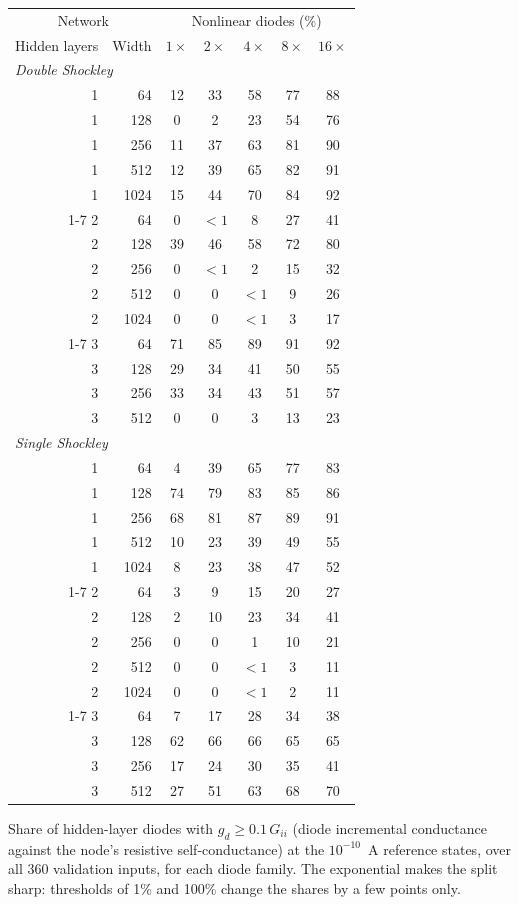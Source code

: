 \documentclass[11pt,a4paper]{article}
\begin{document}
\begin{center}
\small
\begin{tabular}{rr|ccccc}
\multicolumn{2}{c|}{Network} & \multicolumn{5}{c}{Nonlinear diodes (\%)} \\
Hidden layers & Width & $1\times$ & $2\times$ & $4\times$ & $8\times$ & $16\times$ \\
\hline
\multicolumn{7}{l}{\emph{Double Shockley}} \\
1 & 64 & 12 & 33 & 58 & 77 & 88 \\
1 & 128 & 0 & 2 & 23 & 54 & 76 \\
1 & 256 & 11 & 37 & 63 & 81 & 90 \\
1 & 512 & 12 & 39 & 65 & 82 & 91 \\
1 & 1024 & 15 & 44 & 70 & 84 & 92 \\
\cline{1-7}
2 & 64 & 0 & $<1$ & 8 & 27 & 41 \\
2 & 128 & 39 & 46 & 58 & 72 & 80 \\
2 & 256 & 0 & $<1$ & 2 & 15 & 32 \\
2 & 512 & 0 & 0 & $<1$ & 9 & 26 \\
2 & 1024 & 0 & 0 & $<1$ & 3 & 17 \\
\cline{1-7}
3 & 64 & 71 & 85 & 89 & 91 & 92 \\
3 & 128 & 29 & 34 & 41 & 50 & 55 \\
3 & 256 & 33 & 34 & 43 & 51 & 57 \\
3 & 512 & 0 & 0 & 3 & 13 & 23 \\
\hline
\multicolumn{7}{l}{\emph{Single Shockley}} \\
1 & 64 & 4 & 39 & 65 & 77 & 83 \\
1 & 128 & 74 & 79 & 83 & 85 & 86 \\
1 & 256 & 68 & 81 & 87 & 89 & 91 \\
1 & 512 & 10 & 23 & 39 & 49 & 55 \\
1 & 1024 & 8 & 23 & 38 & 47 & 52 \\
\cline{1-7}
2 & 64 & 3 & 9 & 15 & 20 & 27 \\
2 & 128 & 2 & 10 & 23 & 34 & 41 \\
2 & 256 & 0 & 0 & 1 & 10 & 21 \\
2 & 512 & 0 & 0 & $<1$ & 3 & 11 \\
2 & 1024 & 0 & 0 & $<1$ & 2 & 11 \\
\cline{1-7}
3 & 64 & 7 & 17 & 28 & 34 & 38 \\
3 & 128 & 62 & 66 & 66 & 65 & 65 \\
3 & 256 & 17 & 24 & 30 & 35 & 41 \\
3 & 512 & 27 & 51 & 63 & 68 & 70 \\
\end{tabular}

\smallskip
Share of hidden-layer diodes with $g_d \ge 0.1\,G_{ii}$ (diode incremental
conductance against the node's resistive self-conductance) at the
$10^{-10}$~A reference states, over all 360 validation inputs, for each diode
family. The exponential makes the
split sharp: thresholds of 1\% and 100\% change the shares by a few
points only.
\end{center}
\end{document}
